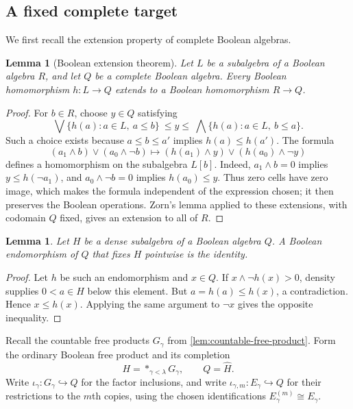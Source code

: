 \documentclass[11pt]{article}
\newtheorem{lemma}[theorem]{Lemma}
\theoremstyle{definition}
\theoremstyle{remark}
\begin{document}
\subsection{A fixed complete target}

We first recall the extension property of complete Boolean algebras.

\begin{lemma}[Boolean extension theorem]\label{lem:boolean-extension}
Let $L$ be a subalgebra of a Boolean algebra $R$, and let $Q$ be a
complete Boolean algebra. Every Boolean homomorphism $h:L\to Q$
extends to a Boolean homomorphism $R\to Q$.
\end{lemma}

\begin{proof}
For $b\in R$, choose $y\in Q$ satisfying
\[
 \bigvee\{h(a):a\in L,\ a\leq b\}
 \ \leq y\leq\
 \bigwedge\{h(a):a\in L,\ b\leq a\}.
\]
Such a choice exists because $a\leq b\leq a'$ implies
$h(a)\leq h(a')$. The formula
\[
 (a_1\wedge b)\vee(a_0\wedge\neg b)
 \longmapsto
 (h(a_1)\wedge y)\vee(h(a_0)\wedge\neg y)
\]
defines a homomorphism on the subalgebra $L[b]$. Indeed,
$a_1\wedge b=0$ implies $y\leq h(\neg a_1)$, and
$a_0\wedge\neg b=0$ implies $h(a_0)\leq y$.
Thus zero cells have zero image, which makes the formula independent of
the expression chosen; it then preserves the Boolean operations.
Zorn's lemma applied to these extensions, with codomain $Q$ fixed,
gives an extension to all of $R$.
\end{proof}

\begin{lemma}\label{lem:dense-fixing}
Let $H$ be a dense subalgebra of a Boolean algebra $Q$. A Boolean
endomorphism of $Q$ that fixes $H$ pointwise is the identity.
\end{lemma}

\begin{proof}
Let $h$ be such an endomorphism and $x\in Q$. If
$x\wedge\neg h(x)>0$, density supplies $0<a\in H$ below this
element. But $a=h(a)\leq h(x)$, a contradiction. Hence
$x\leq h(x)$. Applying the same argument to $\neg x$ gives the
opposite inequality.
\end{proof}

Recall the countable free products $G_\gamma$ from
\cref{lem:countable-free-product}. Form the ordinary Boolean free product
and its completion
\[
 H=*_{\gamma<\lambda}G_\gamma,
 \qquad Q=\widehat H.
\]
Write $\iota_\gamma:G_\gamma\hookrightarrow Q$ for the factor
inclusions, and write
$\iota_{\gamma,m}:E_\gamma\hookrightarrow Q$ for their restrictions
to the $m$th copies, using the chosen identifications
$E_\gamma^{(m)}\cong E_\gamma$.
\end{document}
